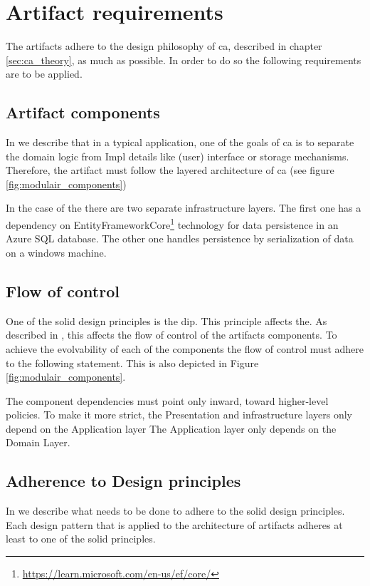 \section{Artifact requirements} \label{sec:artifact_requirements}

The artifacts adhere to the design philosophy of \gls{ca}, described in chapter
\ref{sec:ca_theory}, as much as possible. In order to do so the following
requirements are to be applied.

\subsection{Artifact components}
In  we describe that in a typical application, one of the goals of
\gls{ca} is to separate the domain logic from Impl details like (user) interface
or storage mechanisms. Therefore, the artifact must follow the layered architecture of
\gls{ca} (see figure \ref{fig:modulair_components})

In the case of the  there are two separate infrastructure
layers. The first one has a dependency on
EntityFrameworkCore\footnote{\url{https://learn.microsoft.com/en-us/ef/core/}} technology
for data persistence in an Azure SQL database. The other one handles persistence by
serialization of data on a windows machine.

\subsection{Flow of control}
One of the \gls{solid} design principles is the \acrfull{dip}. This principle affects the.
As described in , this affects the flow of control of the
artifacts components. To achieve the evolvability of each of the components the flow of
control must adhere to the following statement. This is also depicted in Figure
\ref{fig:modulair_components}.

The component dependencies must point only inward, toward higher-level policies. To make
it more strict, the Presentation and infrastructure layers only depend on the Application
layer The Application layer only depends on the  Domain Layer.

\subsection{Adherence to Design principles}
In  we describe what needs to be done to adhere to the
\gls{solid} design principles. Each design pattern that is applied to the architecture of
artifacts adheres at least to one of the \gls{solid} principles.

